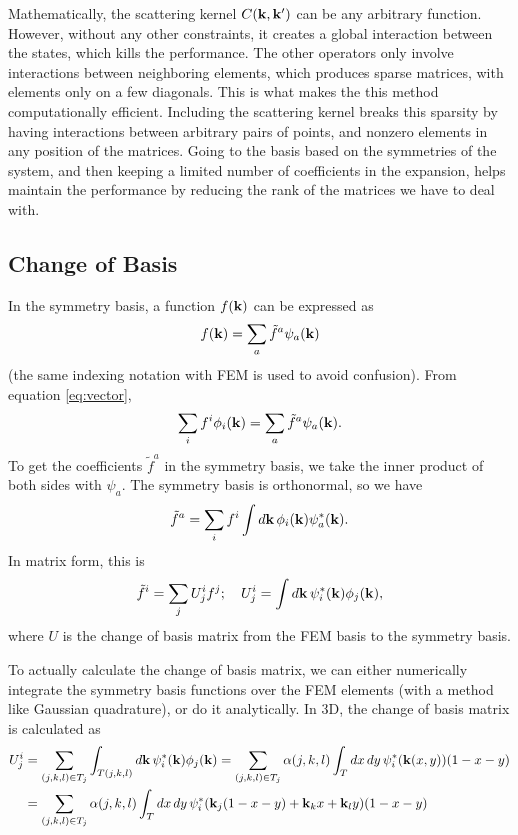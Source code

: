 \documentclass[12pt]{article}
\begin{document}
Mathematically, the scattering kernel $C(\vb{k}, \vb{k'})$ can be any arbitrary function. However,
without any other constraints, it creates a global interaction between the states, which kills the
performance. The other operators only involve interactions between neighboring elements, which
produces sparse matrices, with elements only on a few diagonals. This is what makes the this method
computationally efficient. Including the scattering kernel breaks this sparsity by having
interactions between arbitrary pairs of points, and nonzero elements in any position of
the matrices. Going to the basis based on the symmetries of the system, and then keeping a limited
number of coefficients in the expansion, helps maintain the performance by reducing the rank of the
matrices we have to deal with.

\subsection{Change of Basis}
In the symmetry basis, a function $f(\vb{k})$ can be expressed as
\begin{equation}
    f(\vb{k}) = \sum_a \tilde{f}^a \psi_a(\vb{k})
\end{equation}
(the same indexing notation with FEM is used to avoid confusion). From equation \eqref{eq:vector},
\begin{equation}
    \sum_i f^i \phi_i(\vb{k}) = \sum_a \tilde{f}^a \psi_a(\vb{k}).
    \label{eq:vector_basis_expansion}
\end{equation}
To get the coefficients $\tilde{f}^a$ in the symmetry basis, we take the inner product of both
sides with $\psi_a$. The symmetry basis is orthonormal, so we have
\begin{equation}
    \tilde{f}^a = \sum_{i} f^i \int\dd{\vb{k}}\phi_i(\vb{k}) \psi_a^*(\vb{k}).
\end{equation}
In matrix form, this is
\begin{equation}
    \tilde{f}^i = \sum_j U^i_j f^j; \quad U^i_j = \int\dd{\vb{k}}\psi_i^*(\vb{k})\phi_j(\vb{k}),
\end{equation}
where $U$ is the change of basis matrix from the FEM basis to the symmetry basis.

To actually calculate the change of basis matrix, we can either numerically integrate the symmetry
basis functions over the FEM elements (with a method like Gaussian quadrature), or do it
analytically. In 3D, the change of basis matrix is calculated as
\begin{align}
    U^i_j &= \sum_{(j,k,l) \in T_j} \int_{T(j,k,l)} \dd{\vb{k}} \psi_i^*(\vb{k}) \phi_j(\vb{k})
    = \sum_{(j,k,l) \in T_j} \alpha(j,k,l) \int_T \dd{x} \dd{y} \psi_i^*(\vb{k}(x,y))(1-x-y)
    \\ &= \sum_{(j,k,l) \in T_j} \alpha(j,k,l) \int_T \dd{x} \dd{y}
    \psi_i^*(\vb{k}_j(1-x-y) + \vb{k}_k x + \vb{k}_l y)(1-x-y)
\end{align}
\end{document}
